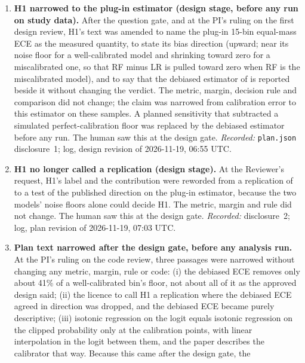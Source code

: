 \documentclass[11pt]{article}
\begin{document}
\begin{enumerate}
  \item \textbf{H1 narrowed to the plug-in estimator (design stage, before any run on study
        data).} After the question gate, and at the PI's ruling on the first design review,
        H1's text was amended to name the plug-in 15-bin equal-mass ECE as the measured
        quantity, to state its bias direction (upward; near its noise floor for a
        well-calibrated model and shrinking toward zero for a miscalibrated one, so that RF
        minus LR is pulled toward zero when RF is the miscalibrated model), and to say that
        the debiased estimator of \citet{kumar2019} is reported beside it without changing
        the verdict. The metric, margin, decision rule and comparison did not change; the
        claim was narrowed from calibration error to this estimator on these samples. A
        planned sensitivity that subtracted a simulated perfect-calibration floor was replaced
        by the debiased estimator before any run. The human saw this at the design gate.
        \emph{Recorded:} \texttt{plan.json} disclosure~1; log, design revision of
        2026-11-19, 06:55 UTC.
  \item \textbf{H1 no longer called a replication (design stage).} At the Reviewer's request,
        H1's label and the contribution were reworded from a replication of
        \citet{niculescumizil2005} to a test of the published direction on the plug-in
        estimator, because the two models' noise floors alone could decide H1. The metric,
        margin and rule did not change. The human saw this at the design gate.
        \emph{Recorded:} disclosure~2; log, plan revision of 2026-11-19, 07:03 UTC.
  \item \textbf{Plan text narrowed after the design gate, before any analysis run.} At the
        PI's ruling on the code review, three passages were narrowed without changing any
        metric, margin, rule or code: (i) the debiased ECE removes only about 41\% of a
        well-calibrated bin's floor, not about all of it as the approved design said;
        (ii) the licence to call H1 a replication where the debiased ECE agreed in direction
        was dropped, and the debiased ECE became purely descriptive; (iii) isotonic
        regression on the logit equals isotonic regression on the clipped probability only at
        the calibration points, with linear interpolation in the logit between them, and the
        paper describes the calibrator that way. Because this came after the design gate, the

\end{enumerate}
\end{document}
